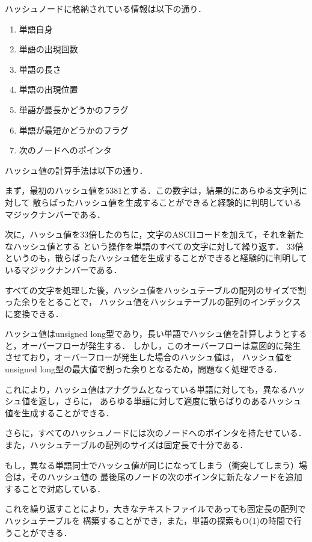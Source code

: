 \documentclass{jsarticle}
\begin{document}
    ハッシュノードに格納されている情報は以下の通り．
    \begin{enumerate}
      \item 単語自身
      \item 単語の出現回数
      \item 単語の長さ
      \item 単語の出現位置
      \item 単語が最長かどうかのフラグ
      \item 単語が最短かどうかのフラグ
      \item 次のノードへのポインタ
    \end{enumerate}

    ハッシュ値の計算手法は以下の通り．

    まず，最初のハッシュ値を5381とする．この数字は，結果的にあらゆる文字列に対して
    散らばったハッシュ値を生成することができると経験的に判明しているマジックナンバーである．

    次に，ハッシュ値を33倍したのちに，文字のASCIIコードを加えて，それを新たなハッシュ値とする
    という操作を単語のすべての文字に対して繰り返す．
    33倍というのも，散らばったハッシュ値を生成することができると経験的に判明しているマジックナンバーである．

    すべての文字を処理した後，ハッシュ値をハッシュテーブルの配列のサイズで割った余りをとることで，
    ハッシュ値をハッシュテーブルの配列のインデックスに変換できる．

    ハッシュ値はunsigned long型であり，長い単語でハッシュ値を計算しようとすると，オーバーフローが発生する．
    しかし，このオーバーフローは意図的に発生させており，オーバーフローが発生した場合のハッシュ値は，
    ハッシュ値をunsigned long型の最大値で割った余りとなるため，問題なく処理できる．

    これにより，ハッシュ値はアナグラムとなっている単語に対しても，異なるハッシュ値を返し，さらに，
    あらゆる単語に対して適度に散らばりのあるハッシュ値を生成することができる．

    さらに，すべてのハッシュノードには次のノードへのポインタを持たせている．
    また，ハッシュテーブルの配列のサイズは固定長で十分である．

    もし，異なる単語同士でハッシュ値が同じになってしまう（衝突してしまう）場合は，そのハッシュ値の
    最後尾のノードの次のポインタに新たなノードを追加することで対応している．
    
    これを繰り返すことにより，大きなテキストファイルであっても固定長の配列でハッシュテーブルを
    構築することができ，また，単語の探索もO(1)の時間で行うことができる．
\end{document}
